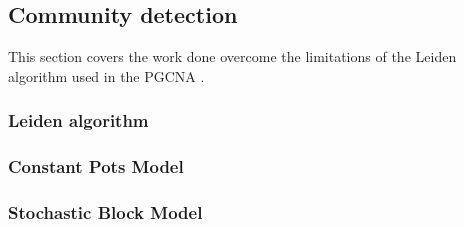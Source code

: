 \subsection{Community detection}

This section covers the work done overcome the limitations of the Leiden algorithm used in the PGCNA \cite{Care2019-ij}.

\subsubsection{Leiden algorithm}

\subsubsection{Constant Pots Model}

\subsubsection{Stochastic Block Model}